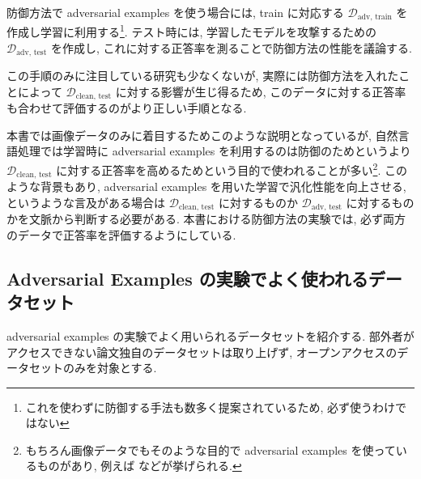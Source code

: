 防御方法で adversarial examples を使う場合には, train に対応する $\mathcal{D}_{\text{adv, train}}$ を作成し学習に利用する\footnote{
これを使わずに防御する手法も数多く提案されているため, 必ず使うわけではない
}.
テスト時には, 学習したモデルを攻撃するための $\mathcal{D}_{\text{adv, test}}$ を作成し, これに対する正答率を測ることで防御方法の性能を議論する.

この手順のみに注目している研究も少なくないが, 実際には防御方法を入れたことによって $\mathcal{D}_{\text{clean, test}}$ に対する影響が生じ得るため, このデータに対する正答率も合わせて評価するのがより正しい手順となる.

本書では画像データのみに着目するためこのような説明となっているが, 自然言語処理では学習時に adversarial examples を利用するのは防御のためというより $\mathcal{D}_{\text{clean, test}}$ に対する正答率を高めるためという目的で使われることが多い\footnote{
もちろん画像データでもそのような目的で adversarial examples を使っているものがあり, 例えば \cite{xie2019adversarial} などが挙げられる.
}.
このような背景もあり, adversarial examples を用いた学習で汎化性能を向上させる, というような言及がある場合は $\mathcal{D}_{\text{clean, test}}$ に対するものか $\mathcal{D}_{\text{adv, test}}$ に対するものかを文脈から判断する必要がある.
本書における防御方法の実験では, 必ず両方のデータで正答率を評価するようにしている.



\subsection{Adversarial Examples の実験でよく使われるデータセット}
\label{subsec:typical-dataset}
adversarial examples の実験でよく用いられるデータセットを紹介する.
部外者がアクセスできない論文独自のデータセットは取り上げず, オープンアクセスのデータセットのみを対象とする.

